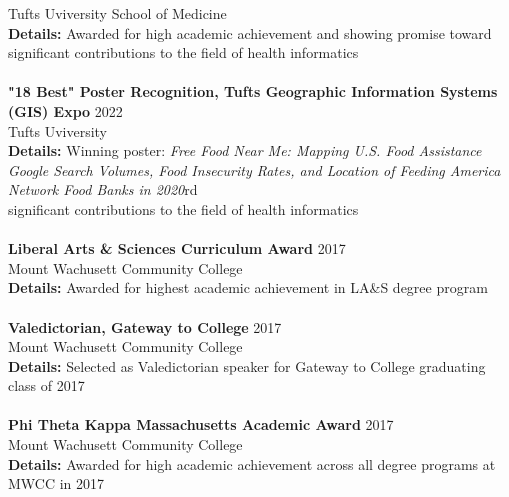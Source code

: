 \documentclass[a4paper,12pt]{article}
\begin{document}
{Tufts Uviversity School of Medicine\\
\textbf{Details:} Awarded for high academic achievement and showing promise toward \\significant contributions to the field of health informatics \\
\\
\textbf{"18 Best" Poster Recognition, Tufts Geographic Information Systems (GIS) Expo} \hfill 2022\\
Tufts Uviversity\\
\textbf{Details:} Winning poster: \textit{Free Food Near Me: Mapping U.S. Food Assistance Google Search Volumes, Food Insecurity Rates, and Location of Feeding America Network Food Banks in 2020}rd \\significant contributions to the field of health informatics \\
\\
\textbf{Liberal Arts \& Sciences Curriculum Award} \hfill 2017\\
Mount Wachusett Community College\\
\textbf{Details:} Awarded for highest academic achievement in LA\&S degree program\\
\\
\textbf{Valedictorian, Gateway to College} \hfill 2017\\
Mount Wachusett Community College\\
\textbf{Details:} Selected as Valedictorian speaker for Gateway to College graduating class of 2017\\
\\
\textbf{Phi Theta Kappa Massachusetts Academic Award} \hfill 2017\\
Mount Wachusett Community College\\
\textbf{Details:} Awarded for high academic achievement across all degree programs at MWCC in 2017\\
}
\end{document}
